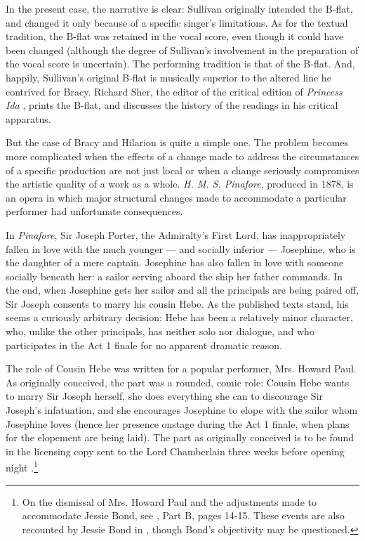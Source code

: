 \begin{paper}
In the present case, the narrative is clear: Sullivan originally
intended the B-flat, and changed it only because of a specific singer's
limitations. As for the textual tradition, the B-flat was retained in
the vocal score, even though it could have been changed (although the
degree of Sullivan's involvement in the preparation of the vocal score
is uncertain). The performing tradition is that of the B-flat. And,
happily, Sullivan's original B-flat is musically superior to the altered
line he contrived for Bracy. Richard Sher, the editor of the critical
edition of \emph{Princess Ida} \citep{sher_critical_2021},
prints the B-flat, and discusses the history of the readings in his
critical apparatus.

But the case of Bracy and Hilarion is quite a simple one. The problem
becomes more complicated when the effects of a change made to address
the circumstances of a specific production are not just local or when a
change seriously compromises the artistic quality of a work as a whole.
\emph{H. M. S. Pinafore}, produced in 1878, is an opera in which major
structural changes made to accommodate a particular performer had
unfortunate consequences.

In \emph{Pinafore}, Sir Joseph Porter, the Admiralty's First Lord, has
inappropriately fallen in love with the much younger --- and socially
inferior --- Josephine, who is the daughter of a mere captain. Josephine
has also fallen in love with someone socially beneath her: a sailor
serving aboard the ship her father commands. In the end, when Josephine
gets her sailor and all the principals are being paired off, Sir Joseph
consents to marry his cousin Hebe. As the published texts stand, his
seems a curiously arbitrary decision: Hebe has been a relatively minor
character, who, unlike the other principals, has neither solo nor
dialogue, and who participates in the Act 1 finale for no apparent
dramatic reason.

The role of Cousin Hebe was written for a popular performer, Mrs. Howard
Paul. As originally conceived, the part was a rounded, comic role:
Cousin Hebe wants to marry Sir Joseph herself, she does everything she
can to discourage Sir Joseph's infatuation, and she encourages Josephine
to elope with the sailor whom Josephine loves (hence her presence
onstage during the Act 1 finale, when plans for the elopement are being
laid). The part as originally conceived is to be found in the licensing
copy sent to the Lord Chamberlain three weeks before opening
night \citep{gilbert_h_1878}.\footnote{On the dismissal of Mrs. Howard Paul and
  the adjustments made to accommodate Jessie Bond, see \citealt{young_introduction_2003}, Part
  B, pages 14-15. These events are also recounted by Jessie Bond in \citealt[pages 58--61]{bond_life_1930}, though Bond's objectivity may be questioned.}


\end{paper}
